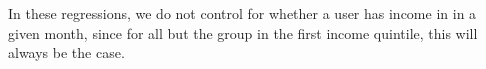 In these regressions, we do not control for whether a user has income in in a
given month, since for all but the group in the first income quintile, this
will always be the case.








